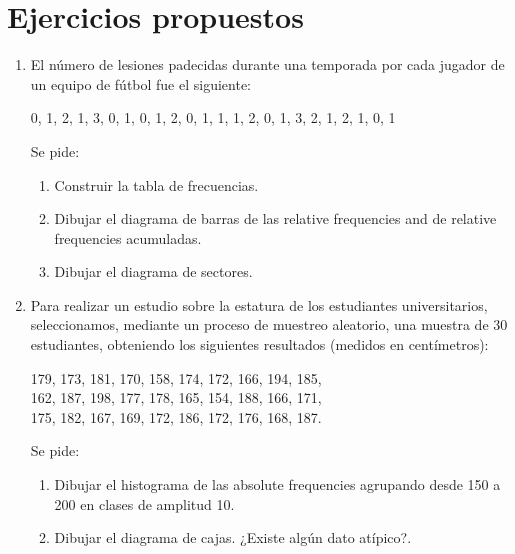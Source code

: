 \section{Ejercicios propuestos}
\begin{enumerate}[leftmargin=*]

\item  El número de lesiones padecidas durante una temporada por cada jugador de un equipo de fútbol fue el siguiente:
\begin{center}
0, 1, 2, 1, 3, 0, 1, 0, 1, 2, 0, 1, 1, 1, 2, 0, 1, 3, 2, 1, 2, 1, 0, 1
\end{center}

Se pide:
\begin{enumerate}
\item Construir la tabla de frecuencias.
\item Dibujar el diagrama de barras de las relative frequencies and de relative frequencies acumuladas.
\item Dibujar el diagrama de sectores.
\end{enumerate}

\item Para realizar un estudio sobre la estatura de los estudiantes universitarios, seleccionamos, mediante un proceso
de muestreo aleatorio, una muestra de 30 estudiantes, obteniendo los siguientes resultados (medidos en centímetros):
\begin{center}
179, 173, 181, 170, 158, 174, 172, 166, 194, 185,\\
162, 187, 198, 177, 178, 165, 154, 188, 166, 171,\\
175, 182, 167, 169, 172, 186, 172, 176, 168, 187.
\end{center}

Se pide:
\begin{enumerate}
\item Dibujar el histograma de las absolute frequencies agrupando desde 150 a 200 en clases de amplitud 10.
\item Dibujar el diagrama de cajas. ¿Existe algún dato atípico?.
\end{enumerate}


\end{enumerate}
